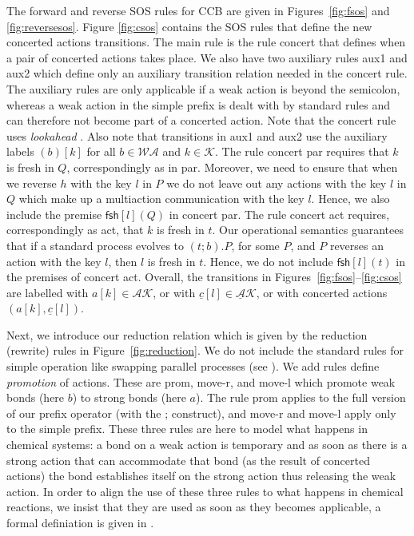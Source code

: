 \documentclass[runningheads]{llncs}
\newcommand{\mWA}{\mathcal{WA}}
\newcommand{\mAK}{\mathcal{AK}}
\newcommand{\umAK}{\underline{\mathcal{A}}\mathcal{K}}
\newcommand{\Keys}{\mathcal{K}}
\newcommand{\fresh}[2]{\mathsf{fsh}[#1](#2)}
\newcommand{\rulename}[1]{\textsf{#1}}
\begin{document}
The forward and reverse SOS rules for CCB are given in Figures~\ref{fig:fsos} and \ref{fig:reversesos}. 
Figure \ref{fig:csos} contains the SOS rules that define the new concerted actions transitions. 
The main rule is the rule \rulename{concert} that defines when a pair of concerted actions 
takes place.  We also have two auxiliary rules \rulename{aux1} and \rulename{aux2} which 
define only an auxiliary transition relation needed in the \rulename{concert} rule. The auxiliary rules are only applicable if a weak action is beyond the semicolon, whereas a weak action in the simple prefix is dealt with by standard rules and can therefore not become part of a concerted action. Note that the \rulename{concert} rule uses \emph{lookahead} \cite{Uli92}.
Also note that transitions in \rulename{aux1} and \rulename{aux2} use the auxiliary labels $(b)[k]$ 
for all $b \in \mWA$ and $k \in \Keys$. The rule \rulename{concert par} requires that $k$ is fresh in $Q$,
correspondingly as in \rulename{par}. Moreover, we need to ensure that when we reverse $h$ with the key $l$
in $P$ we do not leave out any actions with the key $l$ in $Q$ which make up a multiaction 
communication with the key $l$. Hence, we also include the premise $\fresh{l}{Q}$ in \rulename{concert par}.
The rule \rulename{concert act} requires, correspondingly as \rulename{act}, that $k$ is fresh in $t$.
Our operational semantics guarantees that if a standard process evolves to $(t;b).P$, for some $P$, and
$P$ reverses an action with the key $l$, then $l$ is fresh in $t$. Hence, we do not include $\fresh{l}{t}$
in the premises of \rulename{concert act}.
%
%
Overall, the transitions in Figures~\ref{fig:fsos}--\ref{fig:csos} are labelled with $a[k] \in \mAK$, or with 
$\underline{c}[l] \in \umAK$, or with concerted actions $(a[k], \underline{c}[l])$.

Next, we introduce our reduction relation which is given by the reduction (rewrite) rules 
in Figure~\ref{fig:reduction}. We do not include the standard rules for simple operation like swapping parallel processes (see \cite{KUHN201818}). We add rules define {\em promotion} of actions. These are \rulename{prom}, \rulename{move-r}, and \rulename{move-l} which  
promote weak bonds (here $b$) to strong bonds (here $a$).
The rule \rulename{prom} applies to the full version of our prefix operator (with the ; construct), and
\rulename{move-r} and \rulename{move-l} apply only to the simple prefix.
These three rules are here to model what happens in chemical systems: a bond on a weak action is 
temporary and as soon as there is a strong action that can accommodate that bond (as the result
of concerted actions) the bond establishes itself on the strong action thus releasing the weak action.
In order to align the use of these three rules to what happens in chemical reactions, we insist
that they are used as soon as they becomes applicable, a formal definiation is given in \cite{KUHN201818}.
\end{document}
